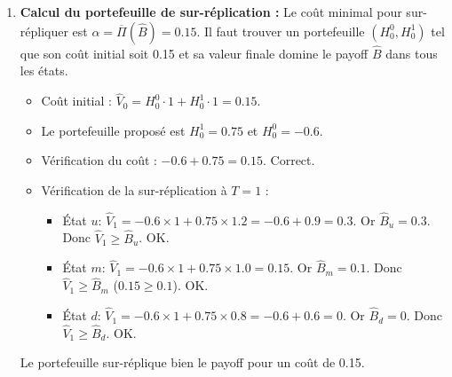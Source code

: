 \begin{enumerate}
\begin{itemize}
        \item $E_{\bar{P}_2}[\hat{B}] = 0 \times 0.3 + 1 \times 0.1 + 0 \times 0 = 0.1$.
    \end{itemize}
    L'intervalle des prix est donc $]0.1, 0.15[$.
    \item \textbf{Calcul du portefeuille de sur-réplication :} Le coût minimal pour sur-répliquer est $\alpha = \overline{\Pi}(\hat{B}) = 0.15$. Il faut trouver un portefeuille $(H_0^0, H_0^1)$ tel que son coût initial soit 0.15 et sa valeur finale domine le payoff $\hat{B}$ dans tous les états.
    \begin{itemize}
        \item Coût initial : $\hat{V}_0 = H_0^0 \cdot 1 + H_0^1 \cdot 1 = 0.15$.
        \item Le portefeuille proposé est $H_0^1 = 0.75$ et $H_0^0 = -0.6$.
        \item Vérification du coût : $-0.6 + 0.75 = 0.15$. Correct.
        \item Vérification de la sur-réplication à $T=1$ :
        \begin{itemize}
            \item État $u$: $\hat{V}_1 = -0.6 \times 1 + 0.75 \times 1.2 = -0.6 + 0.9 = 0.3$. Or $\hat{B}_u = 0.3$. Donc $\hat{V}_1 \ge \hat{B}_u$. OK.
            \item État $m$: $\hat{V}_1 = -0.6 \times 1 + 0.75 \times 1.0 = 0.15$. Or $\hat{B}_m = 0.1$. Donc $\hat{V}_1 \ge \hat{B}_m$ ($0.15 \ge 0.1$). OK.
            \item État $d$: $\hat{V}_1 = -0.6 \times 1 + 0.75 \times 0.8 = -0.6 + 0.6 = 0$. Or $\hat{B}_d = 0$. Donc $\hat{V}_1 \ge \hat{B}_d$. OK.
        \end{itemize}
    \end{itemize}
    Le portefeuille sur-réplique bien le payoff pour un coût de 0.15.
\end{enumerate}
